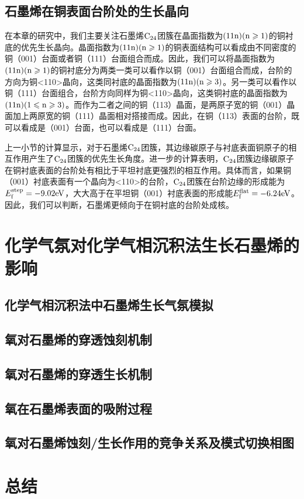     \subsection{石墨烯在铜表面台阶处的生长晶向}
        在本章的研究中，我们主要关注石墨烯$\rm{C_{24}}$团簇在晶面指数为$\rm{(11n)(n \geqslant 1)}$的铜衬底的优先生长晶向。晶面指数为$\rm{(11n)(n \geqslant 1)}$的铜表面结构可以看成由不同密度的铜（001）台面或者铜（111）台面组合而成。因此，我们可以将晶面指数为$\rm{(11n)(n \geqslant 1)}$的铜衬底分为两类\chinesecolon 一类可以看作以铜（001）台面组合而成，台阶的方向为铜<110>晶向，这类同衬底的晶面指数为$\rm{(11n)(n \geqslant 3)}$。另一类可以看作以铜（111）台面组合，台阶方向同样为铜<110>晶向，这类铜衬底的晶面指数为$\rm{(11n)(1 \leqslant n \geqslant 3)}$。而作为二者之间的铜（113）晶面，是两原子宽的铜（001）晶面加上两原宽的铜（111）晶面相对搭接而成。因此，在铜（113）表面的台阶，既可以看成是（001）台面，也可以看成是（111）台面。

        上一小节的计算显示，对于石墨烯$\rm{C_{24}}$团簇，其边缘碳原子与衬底表面铜原子的相互作用产生了$\rm{C_{24}}$团簇的优先生长角度。进一步的计算表明，$\rm{C_{24}}$团簇边缘碳原子在铜衬底表面的台阶处有相比于平坦衬底更强烈的相互作用。具体而言，如果铜（001）衬底表面有一个晶向为<110>的台阶，$\rm{C_{24}}$团簇在台阶边缘的形成能为$E_{\rm f}^{\rm step}=-9.02 \si{\electronvolt}$，大大高于在平坦铜（001）衬底表面的形成能$E_{\rm f}^{\rm flat}=-6.24 \si{\electronvolt}$。因此，我们可以判断，石墨烯更倾向于在铜衬底的台阶处成核。

        

\section{化学气氛对化学气相沉积法生长石墨烯的影响}
\label{sec:石墨烯氧蚀刻穿透}
    \subsection{化学气相沉积法中石墨烯生长气氛模拟}
    \subsection{氧对石墨烯的穿透蚀刻机制}
    \subsection{氧对石墨烯的穿透生长机制}
    \subsection{氧在石墨烯表面的吸附过程}
    \subsection{氧对石墨烯蚀刻/生长作用的竞争关系及模式切换相图}
\section{总结}

